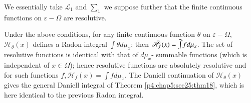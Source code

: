 We essentially take $\mathscr{L}_1$ and $\sum_1$ we suppose further
that the finite continuous functions on $\varepsilon - \Omega$ are
resolutive. 

\begin{prop}\label{p4:chap6:sec30:prop21} %
  Under the above conditions, for any finite continuous function
  $\theta$ on $\varepsilon - \Omega$, $\mathscr{H}_\theta(x)$ defines
  a Radon integral $\int \theta d \mu_x$; then $\bar{\mathscr{H}}_f
  (x)\break =\bar{\int} f d \mu_x$. The set of resolutive functions is
  identical with that of $d \mu_x$- summable functions (which is
  independent of $x \in \Omega$); hence resolutive functions are
  absolutely resolutive and for such functions $f, \mathscr{H}_f (x) =
  \int f d \mu_x$. The Daniell continuation of $\mathscr{H}_\theta
  (x)$ gives the general Daniell integral of Theorem
  \ref{p4:chap5:sec25:thm18}, which is here identical to the previous
  Radon integral.  
\end{prop}
